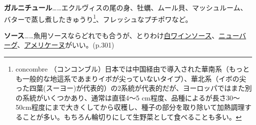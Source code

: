 \textbf{ガルニチュール}\ldots{}\ldots{}エクルヴィスの尾の身、牡蠣、ムール貝、マッシュルーム、バターで蒸し煮したきゅうり\footnote{concombre
  （コンコンブル）日本では中国経由で導入された華南系（もっとも一般的な地這系であまりイボが尖っていないタイプ）、華北系（イボの尖った四葉(スーヨー)が代表的）の2系統が代表的だが、ヨーロッパではまた別の系統がいくつかあり、通常は直径4〜5
  cm程度、品種によるが長さ30〜50cm程度にまで大きくしてから収穫し、種子の部分を取り除いて加熱調理することが多い。もちろん輪切りにして生野菜として食べることも多い。}、フレッシュなプチポワなど。

\textbf{ソース}\ldots{}\ldots{}魚用ソースならどれでも合うが、とりわけ\protect\hyperlink{sauce-vin-blanc}{白ワインソース}、\protect\hyperlink{sauce-a-la-new-berg-cru}{ニューバーグ}、\protect\hyperlink{sauce-americaine}{アメリケーヌ}がいい。(p.301)

